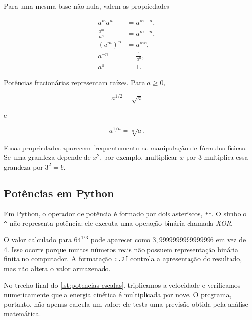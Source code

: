 Para uma mesma base não nula, valem as propriedades

\begin{align}
  a^m a^n &= a^{m+n},\\
  \frac{a^m}{a^n} &= a^{m-n},\\
  \left(a^m\right)^n &= a^{mn},\\
  a^{-n} &= \frac{1}{a^n},\\
  a^0 &= 1.
\end{align}

Potências fracionárias representam raízes. Para $a\geq0$,

\begin{equation}
  a^{1/2}=\sqrt{a}
\end{equation}

e


\begin{equation}
  a^{1/n}=\sqrt[n]{a}.
\end{equation}

Essas propriedades aparecem frequentemente na manipulação de fórmulas físicas. Se uma grandeza depende de $x^2$, por exemplo, multiplicar $x$ por 3 multiplica essa grandeza por $3^2=9$.

\subsection{Potências em Python}

Em Python, o operador de potência é formado por dois asteriscos, \texttt{**}. O símbolo \texttt{\^} não representa potência: ele executa uma operação binária chamada \emph{XOR}.





O valor calculado para $64^{1/3}$ pode aparecer como $3{,}9999999999999996$ em vez de 4. Isso ocorre porque muitos números reais não possuem representação binária finita no computador. A formatação \texttt{:.2f} controla a apresentação do resultado, mas não altera o valor armazenado.

No trecho final do \cref{lst:potencias-escalas}, triplicamos a velocidade e verificamos numericamente que a energia cinética é multiplicada por nove. O programa, portanto, não apenas calcula um valor: ele testa uma previsão obtida pela análise matemática.

